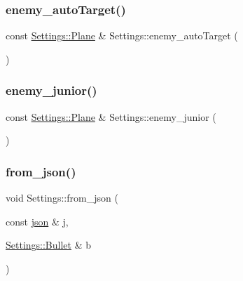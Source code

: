 \subsubsection{\texorpdfstring{enemy\+\_\+auto\+Target()}{enemy\_autoTarget()}}
{\footnotesize\ttfamily const \hyperlink{struct_settings_1_1_plane}{Settings\+::\+Plane} \& Settings\+::enemy\+\_\+auto\+Target (\begin{DoxyParamCaption}{ }\end{DoxyParamCaption})}

\mbox{\label{namespace_settings_a5d571065d327daba740814f8e90261f5}} 
\subsubsection{\texorpdfstring{enemy\+\_\+junior()}{enemy\_junior()}}
{\footnotesize\ttfamily const \hyperlink{struct_settings_1_1_plane}{Settings\+::\+Plane} \& Settings\+::enemy\+\_\+junior (\begin{DoxyParamCaption}{ }\end{DoxyParamCaption})}

\mbox{\label{namespace_settings_a42e5acb521fa66b1f2311a896df95a98}} 
\subsubsection{\texorpdfstring{from\+\_\+json()}{from\_json()}\hspace{0.1cm}{\footnotesize\ttfamily [1/2]}}
{\footnotesize\ttfamily void Settings\+::from\+\_\+json (\begin{DoxyParamCaption}\item[{const \hyperlink{_resources_loader_8cpp_ab701e3ac61a85b337ec5c1abaad6742d}{json} \&}]{j,  }\item[{\hyperlink{struct_settings_1_1_bullet}{Settings\+::\+Bullet} \&}]{b }\end{DoxyParamCaption})}

\mbox{\label{namespace_settings_aaba1604e449415b4bcbbb0a6e50a0ac9}} 
